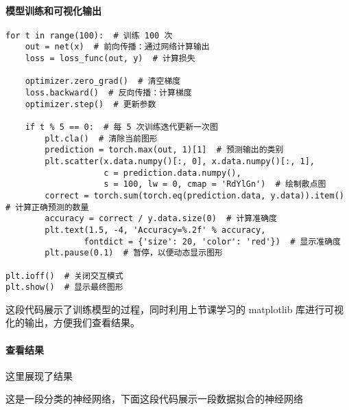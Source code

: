 \documentclass[16pt]{lzc}
\begin{document}
    \paragraph{模型训练和可视化输出}
        \begin{verbatim}
for t in range(100):  # 训练 100 次
    out = net(x)  # 前向传播：通过网络计算输出
    loss = loss_func(out, y)  # 计算损失

    optimizer.zero_grad()  # 清空梯度
    loss.backward()  # 反向传播：计算梯度
    optimizer.step()  # 更新参数

    if t % 5 == 0:  # 每 5 次训练迭代更新一次图
        plt.cla()  # 清除当前图形
        prediction = torch.max(out, 1)[1]  # 预测输出的类别
        plt.scatter(x.data.numpy()[:, 0], x.data.numpy()[:, 1],
                    c = prediction.data.numpy(),
                    s = 100, lw = 0, cmap = 'RdYlGn')  # 绘制散点图
        correct = torch.sum(torch.eq(prediction.data, y.data)).item()  # 计算正确预测的数量
        accuracy = correct / y.data.size(0)  # 计算准确度
        plt.text(1.5, -4, 'Accuracy=%.2f' % accuracy,
                fontdict = {'size': 20, 'color': 'red'})  # 显示准确度
        plt.pause(0.1)  # 暂停，以便动态显示图形

plt.ioff()  # 关闭交互模式
plt.show()  # 显示最终图形
        \end{verbatim}

        这段代码展示了训练模型的过程，同时利用上节课学习的 matplotlib 库进行可视化的输出，方便我们查看结果。

    \paragraph{查看结果}
        这里展现了结果

        \newpage
        这是一段分类的神经网络，下面这段代码展示一段数据拟合的神经网络
\end{document}
